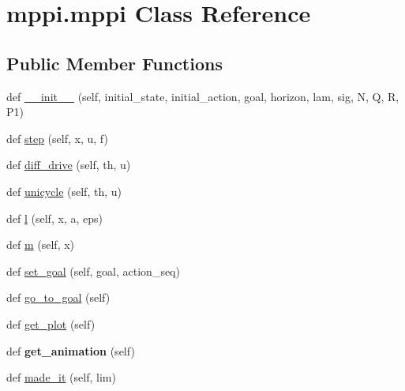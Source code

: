\hypertarget{classmppi_1_1mppi}{}\section{mppi.\+mppi Class Reference}
\label{classmppi_1_1mppi}
\subsection*{Public Member Functions}
\begin{DoxyCompactItemize}
\item 
def \hyperlink{classmppi_1_1mppi_ae70b7800222b3d3fa78a5c971379a7ce}{\+\_\+\+\_\+init\+\_\+\+\_\+} (self, initial\+\_\+state, initial\+\_\+action, goal, horizon, lam, sig, N, Q, R, P1)
\item 
def \hyperlink{classmppi_1_1mppi_aefb1b323eed26eb12ddfaf7dfa51365b}{step} (self, x, u, f)
\item 
def \hyperlink{classmppi_1_1mppi_a15f30c6bfee7ffcd317c609858e28872}{diff\+\_\+drive} (self, th, u)
\item 
def \hyperlink{classmppi_1_1mppi_a2729bb6fc99b1f9d5e4bf0b4e266cb28}{unicycle} (self, th, u)
\item 
def \hyperlink{classmppi_1_1mppi_afb42580c212d2f8b3a91769c310b2a59}{l} (self, x, a, eps)
\item 
def \hyperlink{classmppi_1_1mppi_a4ef334166e9f0a70c4e1f10b4e09ec19}{m} (self, x)
\item 
def \hyperlink{classmppi_1_1mppi_ae8da14cd9e13cc8db319b60342534759}{set\+\_\+goal} (self, goal, action\+\_\+seq)
\item 
def \hyperlink{classmppi_1_1mppi_ae61896acd71b74fd6031675e5a810115}{go\+\_\+to\+\_\+goal} (self)
\item 
def \hyperlink{classmppi_1_1mppi_ac7537cf9afe61a1fd82b820439893e67}{get\+\_\+plot} (self)
\item 
\mbox{\label{classmppi_1_1mppi_a4ec9118d61c9eeb16ab0948016496888}} 
def {\bfseries get\+\_\+animation} (self)
\item 
def \hyperlink{classmppi_1_1mppi_aa571b7cb2b4733b126a35029c1a0ee48}{made\+\_\+it} (self, lim)
\end{DoxyCompactItemize}
